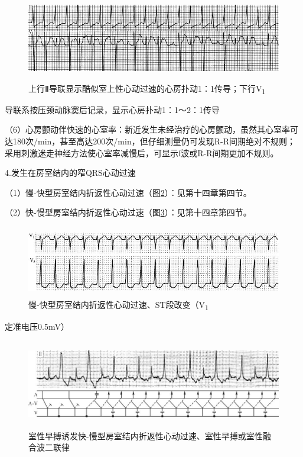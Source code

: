 \begin{figure}[!htbp]
 \centering
 \includegraphics[width=5.58333in,height=1.47917in]{./images/Image00523.jpg}
 \captionsetup{justification=centering}
 \caption{上行Ⅱ导联显示酷似室上性心动过速的心房扑动1：1传导；下行V\textsubscript{1}}
 \label{fig32-7}
  \end{figure} 
导联系按压颈动脉窦后记录，显示心房扑动1：1～2：1传导

（6）心房颤动伴快速的心室率：新近发生未经治疗的心房颤动，虽然其心室率可达180次/min，甚至高达200次/min，但仔细测量仍可发现R-R间期绝对不规则；采用刺激迷走神经方法使心室率减慢后，可显示f波或R-R间期更加不规则。

4.发生在房室结内的窄QRS心动过速

（1）慢-快型房室结内折返性心动过速（图\ref{fig32-8}）：见第十四章第四节。

（2）快-慢型房室结内折返性心动过速（图\ref{fig32-9}）：见第十四章第四节。

\begin{figure}[!htbp]
 \centering
 \includegraphics[width=5.34375in,height=1.22917in]{./images/Image00524.jpg}
 \captionsetup{justification=centering}
 \caption{慢-快型房室结内折返性心动过速、ST段改变（V\textsubscript{1}}
 \label{fig32-8}
  \end{figure} 
定准电压0.5mV）

\begin{figure}[!htbp]
 \centering
 \includegraphics[width=5.77083in,height=1.53125in]{./images/Image00525.jpg}
 \captionsetup{justification=centering}
 \caption{室性早搏诱发快-慢型房室结内折返性心动过速、室性早搏或室性融合波二联律}
 \label{fig32-9}
  \end{figure} 

